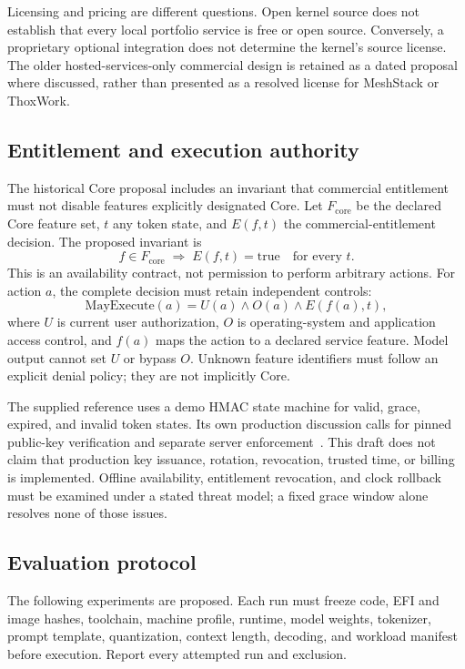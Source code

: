 \documentclass[11pt,a4paper]{article}
\begin{document}
Licensing and pricing are different questions. Open kernel source does not establish that every local portfolio service is free or open source. Conversely, a proprietary optional integration does not determine the kernel's source license. The older hosted-services-only commercial design is retained as a dated proposal where discussed, rather than presented as a resolved license for MeshStack or ThoxWork.

\subsection{Entitlement and execution authority}
The historical Core proposal includes an invariant that commercial entitlement must not disable features explicitly designated Core. Let $F_{\mathrm{core}}$ be the declared Core feature set, $t$ any token state, and $E(f,t)$ the commercial-entitlement decision. The proposed invariant is
\begin{equation}
 f\in F_{\mathrm{core}}\;\Longrightarrow\;E(f,t)=\mathrm{true}\quad\text{for every }t.
\label{eq:entitlement}
\end{equation}
This is an availability contract, not permission to perform arbitrary actions. For action $a$, the complete decision must retain independent controls:
\begin{equation}
 \mathrm{MayExecute}(a)=U(a)\land O(a)\land E(f(a),t),
\label{eq:authority}
\end{equation}
where $U$ is current user authorization, $O$ is operating-system and application access control, and $f(a)$ maps the action to a declared service feature. Model output cannot set $U$ or bypass $O$. Unknown feature identifiers must follow an explicit denial policy; they are not implicitly Core.

The supplied reference uses a demo HMAC state machine for valid, grace, expired, and invalid token states. Its own production discussion calls for pinned public-key verification and separate server enforcement~\cite{historical,hmac}. This draft does not claim that production key issuance, rotation, revocation, trusted time, or billing is implemented. Offline availability, entitlement revocation, and clock rollback must be examined under a stated threat model; a fixed grace window alone resolves none of those issues.

\subsection{Evaluation protocol}
The following experiments are proposed. Each run must freeze code, EFI and image hashes, toolchain, machine profile, runtime, model weights, tokenizer, prompt template, quantization, context length, decoding, and workload manifest before execution. Report every attempted run and exclusion.
\end{document}
